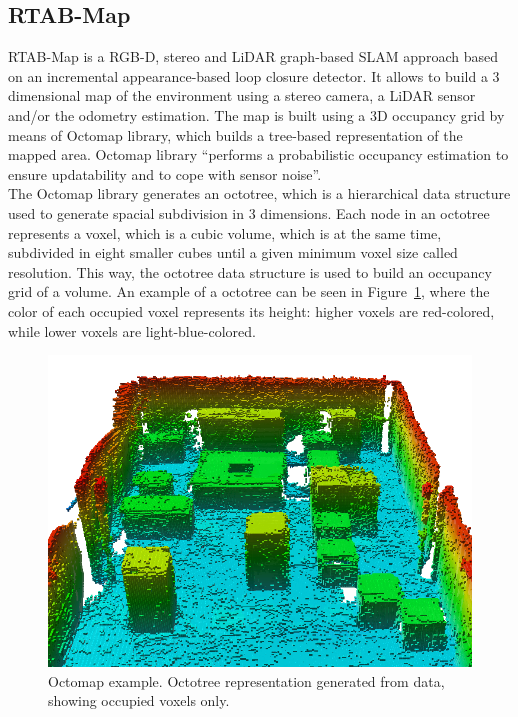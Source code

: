 \subsection{RTAB-Map}
\label{subsec:chapter1:ros:octomap}
\ac{RTAB-Map} is a RGB-D, stereo and LiDAR graph-based \ac{SLAM} approach based on an incremental appearance-based loop closure detector. It allows to build a 3 dimensional map of the environment using a stereo camera, a LiDAR sensor and/or the odometry estimation. The map is built using a 3D occupancy grid by means of Octomap library, which builds a tree-based representation of the mapped area. Octomap library \enquote{performs a probabilistic occupancy estimation to ensure updatability and to cope with sensor noise}\cite{octomap-paper}.\\

The Octomap library generates an octotree, which is a hierarchical data structure used to generate spacial subdivision in 3 dimensions. Each node in an octotree represents a voxel, which is a cubic volume, which is at the same time, subdivided in eight smaller cubes until a given minimum voxel size called resolution. This way, the octotree data structure is used to build an occupancy grid of a volume. An example of a octotree can be seen in Figure~\ref{fig:chapter1:ros:octomap}, where the color of each occupied voxel represents its height: higher voxels are red-colored, while lower voxels are light-blue-colored.\\

\begin{figure}
    \centering
    \includegraphics[width=\textwidth]{Images/fig14-octomap-colored2.png}
    \caption[Octomap example]{Octomap example. Octotree representation generated from data, showing occupied voxels only. \cite{octomap-paper}}
    \label{fig:chapter1:ros:octomap}
\end{figure}

